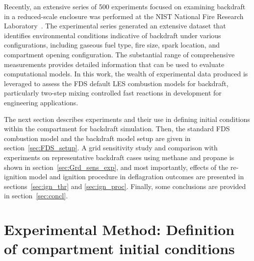 \documentclass[12pt,letterpaper]{article}
\begin{document}
\begin{flushleft}
Recently, an extensive series of 500 experiments focused on examining backdraft in a reduced-scale enclosure was performed at the NIST National Fire Research Laboratory~\cite{Falkenstein2022}. The experimental series generated an extensive dataset that identifies environmental conditions indicative of backdraft under various configurations, including gaseous fuel type, fire size, spark location, and compartment opening configuration. The substantial range of comprehensive measurements provides detailed information that can be used to evaluate computational models. In this work, the wealth of experimental data produced is leveraged to assess the FDS default LES combustion models for backdraft, particularly two-step mixing controlled fast reactions in development for engineering applications.  

The next section describes experiments and their use in defining initial conditions within the compartment for backdraft simulation. Then, the standard FDS combustion model and the backdraft model setup are given in section~\ref{sec:FDS_setup}. A grid sensitivity study and comparison with experiments on representative backdraft cases using methane and propane is shown in section~\ref{sec:Grd_sens_exp}, and most importantly, effects of the re-ignition model and ignition procedure in deflagration outcomes are presented in sections~\ref{sec:ign_thr} and \ref{sec:ign_proc}. Finally, some conclusions are provided in section~\ref{sec:concl}.


\section{Experimental Method: Definition of compartment initial conditions}
\label{sec_exp_meth}


\end{flushleft}
\end{document}
